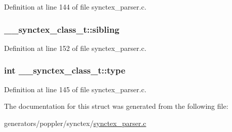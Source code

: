 Definition at line 144 of file synctex\+\_\+parser.\+c.

\hypertarget{struct____synctex__class__t_afd60732f9f1a051b978fb0efa2d786f4}{
\subsubsection[{sibling}]{ \+\_\+\+\_\+synctex\+\_\+class\+\_\+t\+::sibling}}\label{struct____synctex__class__t_afd60732f9f1a051b978fb0efa2d786f4}


Definition at line 152 of file synctex\+\_\+parser.\+c.

\hypertarget{struct____synctex__class__t_aeafcb7d3d64d9a0c0632bd1d6e84b961}{
\subsubsection[{type}]{\setlength{\rightskip}{0pt plus 5cm}int \+\_\+\+\_\+synctex\+\_\+class\+\_\+t\+::type}}\label{struct____synctex__class__t_aeafcb7d3d64d9a0c0632bd1d6e84b961}


Definition at line 145 of file synctex\+\_\+parser.\+c.



The documentation for this struct was generated from the following file\+:\begin{DoxyCompactItemize}
\item 
generators/poppler/synctex/\hyperlink{synctex__parser_8c}{synctex\+\_\+parser.\+c}\end{DoxyCompactItemize}
